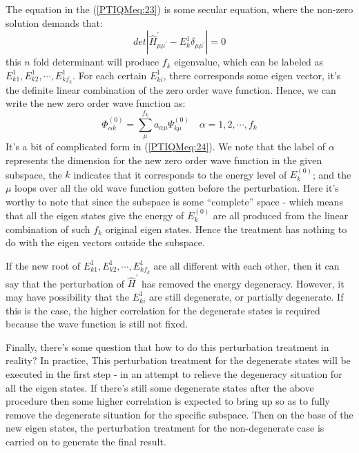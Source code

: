 The equation in the (\ref{PTIQMeq:23}) is some secular equation,
where the non-zero solution demands that:
\begin{equation}\label{PTIQMeq:27}
det|\hat{H}^{'}_{\mu\mu^{'}} - E^{1}_{k}\delta_{\mu\mu^{'}}| = 0
\end{equation}
this $n$ fold determinant will produce $f_{k}$ eigenvalue, which can
be labeled as $E^{1}_{k1}, E^{1}_{k2}, \cdots, E^{1}_{kf_{k}}$. For
each certain $E^{1}_{ki}$, there corresponds some eigen vector, it's
the definite linear combination of the zero order wave function.
Hence, we can write the new zero order wave function as:
\begin{equation}\label{PTIQMeq:24}
\Phi^{(0)}_{\alpha k} =
\sum_{\mu}^{f_{k}}a_{\alpha\mu}\Psi_{k\mu}^{(0)} \quad \alpha =
1,2,\cdots, f_{k}
\end{equation}
It's a bit of complicated form in (\ref{PTIQMeq:24}). We note that
the label of $\alpha$ represents the dimension for the new zero
order wave function in the given subspace, the $k$ indicates that it
corresponds to the energy level of $E_{k}^{(0)}$; and the $\mu$
loops over all the old wave function gotten before the perturbation.
Here it's worthy to note that since the subspace is some
``complete'' space - which means that all the eigen states give the
energy of $E_{k}^{(0)}$ are all produced from the linear combination
of such $f_{k}$ original eigen states. Hence the treatment has
nothing to do with the eigen vectors outside the subspace.

If the new root of $E^{1}_{k1}, E^{1}_{k2}, \cdots, E^{1}_{kf_{k}}$
are all different with each other, then it can say that the
perturbation of $\hat{H}^{'}$ has removed the energy degeneracy.
However, it may have possibility that the $E^{1}_{ki}$ are still
degenerate, or partially degenerate. If this is the case, the higher
correlation for the degenerate states is required because the wave
function is still not fixed.

Finally, there's some question that how to do this perturbation
treatment in reality? In practice, This perturbation treatment for
the degenerate states will be executed in the first step - in an
attempt to relieve the degeneracy situation for all the eigen
states. If there's still some degenerate states after the above
procedure then some higher correlation is expected to bring up so as
to fully remove the degenerate situation for the specific subspace.
Then on the base of the new eigen states, the perturbation treatment
for the non-degenerate case is carried on to generate the final
result.


